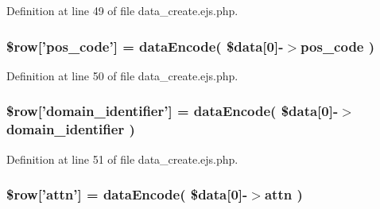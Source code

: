 \-Definition at line 49 of file data\-\_\-create.\-ejs.\-php.

\hypertarget{patientfile_2immnunization_2data__create_8ejs_8php_a356c4da2469428341dbff416200baee5}{
\subsubsection[{\$row}]{\setlength{\rightskip}{0pt plus 5cm}\$row\mbox{[}'pos\-\_\-code'\mbox{]} = {\bf data\-Encode}( \$data\mbox{[}0\mbox{]}-\/$>$pos\-\_\-code )}}\label{patientfile_2immnunization_2data__create_8ejs_8php_a356c4da2469428341dbff416200baee5}


\-Definition at line 50 of file data\-\_\-create.\-ejs.\-php.

\hypertarget{patientfile_2immnunization_2data__create_8ejs_8php_a1c503dc6be7e45d4cce60426e0dc6c16}{
\subsubsection[{\$row}]{\setlength{\rightskip}{0pt plus 5cm}\$row\mbox{[}'domain\-\_\-identifier'\mbox{]} = {\bf data\-Encode}( \$data\mbox{[}0\mbox{]}-\/$>$domain\-\_\-identifier )}}\label{patientfile_2immnunization_2data__create_8ejs_8php_a1c503dc6be7e45d4cce60426e0dc6c16}


\-Definition at line 51 of file data\-\_\-create.\-ejs.\-php.

\hypertarget{patientfile_2immnunization_2data__create_8ejs_8php_af8886f39ae82fe4c6411bad1e0097c79}{
\subsubsection[{\$row}]{\setlength{\rightskip}{0pt plus 5cm}\$row\mbox{[}'attn'\mbox{]} = {\bf data\-Encode}( \$data\mbox{[}0\mbox{]}-\/$>$attn )}}\label{patientfile_2immnunization_2data__create_8ejs_8php_af8886f39ae82fe4c6411bad1e0097c79}


